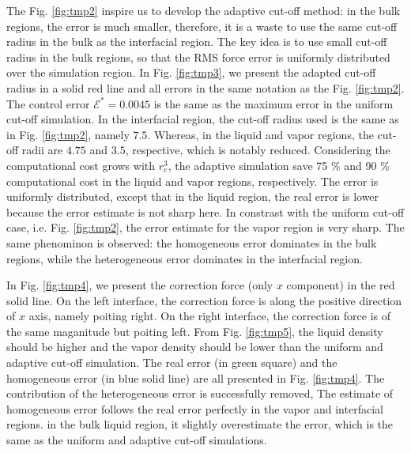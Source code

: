 \documentclass[aps,pre,preprint]{revtex4}
\begin{document}
The Fig. \ref{fig:tmp2} inspire us to develop the adaptive cut-off
method: in the bulk regions, the error is much smaller, therefore, it
is a waste to use the same cut-off radius in the bulk as the
interfacial region. The key idea is to use small cut-off radius in the
bulk regions, so that the RMS force error is uniformly distributed
over the simulation region. In Fig. \ref{fig:tmp3}, we present the
adapted cut-off radius in a solid red line and all errors in the same
notation as the Fig. \ref{fig:tmp2}. The control error $\mathcal
E^\ast = 0.0045$ is the same as the maximum error in the uniform
cut-off simulation. In the interfacial region, the cut-off radius used
is the same as in Fig. \ref{fig:tmp2}, namely $7.5$.  Whereas, in the
liquid and vapor regions, the cut-off radii are $4.75$ and $3.5$,
respective, which is notably reduced. Considering the computational
cost grows with $r_c^3$, the adaptive simulation save 75 \% and 90 \%
computational cost in the liquid and vapor regions, respectively.  The
error is uniformly distributed, except that in the liquid region, the
real error is lower because the error estimate is not sharp here. In
constrast with the uniform cut-off case, i.e. Fig. \ref{fig:tmp2}, the
error estimate for the vapor region is very sharp. The same phenominon
is observed: the homogeneous error dominates in the bulk regions,
while the heterogeneous error dominates in the interfacial region.

In Fig. \ref{fig:tmp4}, we present the correction force (only $x$
component) in the red solid line. On the left interface, the
correction force is along the positive direction of $x$ axis, namely
poiting right.  On the right interface, the correction force is of the
same maganitude but poiting left. From Fig. \ref{fig:tmp5}, the liquid
density should be higher and the vapor density should be lower than
the uniform and adaptive cut-off simulation.  The real error (in green
square) and the homogeneous error (in blue solid line) are all
presented in Fig. \ref{fig:tmp4}. The contribution of the
heterogeneous error is successfully removed, The estimate of
homogeneous error follows the real error perfectly in the vapor and
interfacial regions.  in the bulk liquid region, it slightly
overestimate the error, which is the same as the uniform and adaptive
cut-off simulations.
\end{document}
